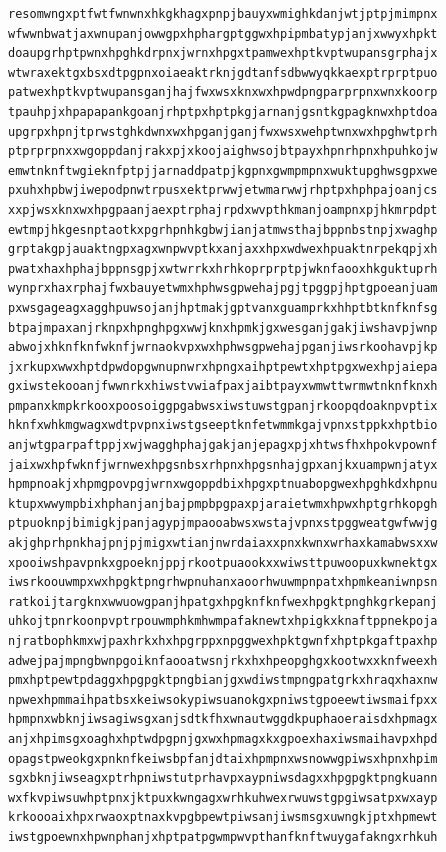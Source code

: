 \documentclass[11pt,letterpaper]{exam}
\begin{document}
\begin{questions}
\begin{verbatim}
resomwngxptfwtfwnwnxhkgkhagxpnpjbauyxwmighkdanjwtjptpjmimpnx
wfwwnbwatjaxwnupanjowwgpxhphargptggwxhpipmbatypjanjxwwyxhpkt
doaupgrhptpwnxhpghkdrpnxjwrnxhpgxtpamwexhptkvptwupansgrphajx
wtwraxektgxbsxdtpgpnxoiaeaktrknjgdtanfsdbwwyqkkaexptrprptpuo
patwexhptkvptwupansganjhajfwxwsxknxwxhpwdpngparprpnxwnxkoorp
tpauhpjxhpapapankgoanjrhptpxhptpkgjarnanjgsntkgpagknwxhptdoa
upgrpxhpnjtprwstghkdwnxwxhpganjganjfwxwsxwehptwnxwxhpghwtprh
ptprprpnxxwgoppdanjrakxpjxkoojaighwsojbtpayxhpnrhpnxhpuhkojw
emwtnknftwgieknfptpjjarnaddpatpjkgpnxgwmpmpnxwuktupghwsgpxwe
pxuhxhpbwjiwepodpnwtrpusxektprwwjetwmarwwjrhptpxhphpajoanjcs
xxpjwsxknxwxhpgpaanjaexptrphajrpdxwvpthkmanjoampnxpjhkmrpdpt
ewtmpjhkgesnptaotkxpgrhpnhkgbwjianjatmwsthajbppnbstnpjxwaghp
grptakgpjauaktngpxagxwnpwvptkxanjaxxhpxwdwexhpuaktnrpekqpjxh
pwatxhaxhphajbppnsgpjxwtwrrkxhrhkoprprptpjwknfaooxhkguktuprh
wynprxhaxrphajfwxbauyetwmxhphwsgpwehajpgjtpggpjhptgpoeanjuam
pxwsgageagxagghpuwsojanjhptmakjgptvanxguamprkxhhptbtknfknfsg
btpajmpaxanjrknpxhpnghpgxwwjknxhpmkjgxwesganjgakjiwshavpjwnp
abwojxhknfknfwknfjwrnaokvpxwxhphwsgpwehajpganjiwsrkoohavpjkp
jxrkupxwwxhptdpwdopgwnupnwrxhpngxaihptpewtxhptpgxwexhpjaiepa
gxiwstekooanjfwwnrkxhiwstvwiafpaxjaibtpayxwmwttwrmwtnknfknxh
pmpanxkmpkrkooxpoosoiggpgabwsxiwstuwstgpanjrkoopqdoaknpvptix
hknfxwhkmgwagxwdtpvpnxiwstgseeptknfetwmmkgajvpnxstppkxhptbio
anjwtgparpaftppjxwjwagghphajgakjanjepagxpjxhtwsfhxhpokvpownf
jaixwxhpfwknfjwrnwexhpgsnbsxrhpnxhpgsnhajgpxanjkxuampwnjatyx
hpmpnoakjxhpmgpovpgjwrnxwgoppdbixhpgxptnuabopgwexhpghkdxhpnu
ktupxwwympbixhphanjanjbajpmpbpgpaxpjaraietwmxhpwxhptgrhkopgh
ptpuoknpjbimigkjpanjagypjmpaooabwsxwstajvpnxstpggweatgwfwwjg
akjghprhpnkhajpnjpjmigxwtianjnwrdaiaxxpnxkwnxwrhaxkamabwsxxw
xpooiwshpavpnkxgpoeknjppjrkootpuaookxxwiwsttpuwoopuxkwnektgx
iwsrkoouwmpxwxhpgktpngrhwpnuhanxaoorhwuwmpnpatxhpmkeaniwnpsn
ratkoijtargknxwwuowgpanjhpatgxhpgknfknfwexhpgktpnghkgrkepanj
uhkojtpnrkoonpvptrpouwmphkmhwmpafaknewtxhpigkxknaftppnekpoja
njratbophkmxwjpaxhrkxhxhpgrppxnpggwexhpktgwnfxhptpkgaftpaxhp
adwejpajmpngbwnpgoiknfaooatwsnjrkxhxhpeopghgxkootwxxknfweexh
pmxhptpewtpdaggxhpgpgktpngbianjgxwdiwstmpngpatgrkxhraqxhaxnw
npwexhpmmaihpatbsxkeiwsokypiwsuanokgxpniwstgpoeewtiwsmaifpxx
hpmpnxwbknjiwsagiwsgxanjsdtkfhxwnautwggdkpuphaoeraisdxhpmagx
anjxhpimsgxoaghxhptwdpgpnjgxwxhpmagxkxgpoexhaxiwsmaihavpxhpd
opagstpweokgxpnknfkeiwsbpfanjdtaixhpmpnxwsnowwgpiwsxhpnxhpim
sgxbknjiwseagxptrhpniwstutprhavpxaypniwsdagxxhpgpgktpngkuann
wxfkvpiwsuwhptpnxjktpuxkwngagxwrhkuhwexrwuwstgpgiwsatpxwxayp
krkoooaixhpxrwaoxptnaxkvpgbpewtpiwsanjiwsmsgxuwngkjptxhpmewt
iwstgpoewnxhpwnphanjxhptpatpgwmpwvpthanfknftwuygafakngxrhkuh

\end{verbatim}
\end{questions}
\end{document}
